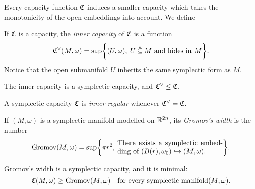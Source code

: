 \documentclass[../main-v2-manifolds.tex]{subfiles}
\begin{document}
Every capacity function $\mathfrak{C}$ induces a smaller capacity which takes the monotonicity of the open embeddings into account. We define 
\begin{definition}
    If $\mathfrak{C}$ is a capacity, the \emph{inner capacity} of $\mathfrak{C}$ is a function
    \[
        \mathfrak{C}^{\vee}(M,\omega) = \sup\biggl\{{(U,\omega),\: U\:\mathring{\subseteq}\: M\text{ and hides in } M}\biggr\}.
    \]
    Notice that the open submanifold $U$ inherits the same symplectic form as $M$. 
\end{definition}
\begin{wts}
    The inner capacity is a symplectic capacity, and $\mathfrak{C}^\vee\leq \mathfrak{C}$.
\end{wts}
\begin{definition}
    A symplectic capacity $\mathfrak{C}$ is \emph{inner regular} whenever $\mathfrak{C}^\vee = \mathfrak{C}$.
\end{definition}
\begin{definition}
    If $(M,\omega)$ is a symplectic manifold modelled on ${\mathbb{R}^{2n}}$, its \emph{Gromov's width} is the number 
    \[
        \Grom(M,\omega) = \sup\bigset{\pi r^2,\: \parbox{15em}{There exists a symplectic embedding of $(B(r),\omega_0)\hookrightarrow (M,\omega)$.}}.
    \]
\end{definition}
\begin{wts}
    Gromov's width is a symplectic capacity, and it is minimal:
    \[
        \mathfrak{C}(M,\omega)\geq \mathrm{Gromov}(M,\omega)\quad\text{for every symplectic manifold} (M,\omega).
    \]
\end{wts}
\end{document}
